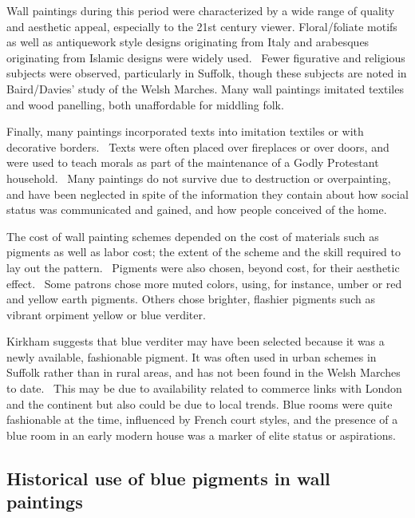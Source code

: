 Wall paintings during this period were characterized by a wide range of quality and aesthetic appeal, especially to the 21st century viewer. Floral/foliate motifs as well as antiquework style designs originating from Italy and arabesques originating from Islamic designs were widely used.~\autocite{Kirkham_thesis,Baird_thesis,Thornton_book} Fewer figurative and religious subjects were observed, particularly in Suffolk, though these subjects are noted in Baird/Davies' study of the Welsh Marches. Many wall paintings imitated textiles and wood panelling, both unaffordable for middling folk. 

Finally, many paintings incorporated texts into imitation textiles or with decorative borders.~\autocite{Baird_thesis,Kirkham_thesis} Texts were often placed over fireplaces or over doors, and were used to teach morals as part of the maintenance of a Godly Protestant household.~\autocite{Hamling_book} Many paintings do not survive due to destruction or overpainting, and have been neglected in spite of the information they contain about how social status was communicated and gained, and how people conceived of the home.~\autocite{Benton1,Benton2,Kirkham_thesis}

The cost of wall painting schemes depended on the cost of materials such as pigments as well as labor cost; the extent of the scheme and the skill required to lay out the pattern.~\autocite{Baird_thesis,Davies_book,Kirkham_thesis} Pigments were also chosen, beyond cost, for their aesthetic effect.~\autocite{Kirkham_thesis} Some patrons chose more muted colors, using, for instance, umber or red and yellow earth pigments. Others chose brighter, flashier pigments such as vibrant orpiment yellow or blue verditer. 

Kirkham suggests that blue verditer may have been selected because it was a newly available, fashionable pigment. It was often used in urban schemes in Suffolk rather than in rural areas, and has not been found in the Welsh Marches to date.~\autocite{Kirkham_thesis,Baird_thesis} This may be due to availability related to commerce links with London and the continent but also could be due to local trends. Blue rooms were quite fashionable at the time, influenced by French court styles, and the presence of a blue room in an early modern house was a marker of elite status or aspirations.~\autocite{Kirkham_thesis}

\subsection[Historical use of blue pigments in wall paintings]{Historical use of blue pigments in wall paintings}
\label{subsection1.1.2}

